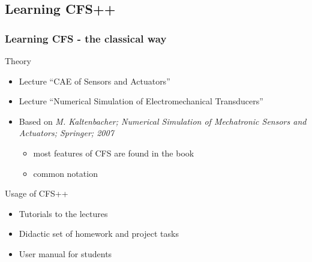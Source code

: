 \documentclass{beamer}
\begin{document}
\subsection{Learning CFS++}

\begin{frame}
\frametitle{Learning CFS - the classical way}
Theory
\begin{itemize}
  \item Lecture ``CAE of Sensors and Actuators''
  \item Lecture ``Numerical Simulation of Electromechanical Transducers''
  \item Based on \textit{M. Kaltenbacher; Numerical Simulation of Mechatronic Sensors and Actuators; Springer; 2007}
  \begin{itemize}
    \item most features of CFS are found in the book
    \item common notation
  \end{itemize}  
\end{itemize}
Usage of CFS++
\begin{itemize}
  \item Tutorials to the lectures
  \item Didactic set of homework and project tasks
  \item User manual for students 
\end{itemize}
\end{frame}
\end{document}
